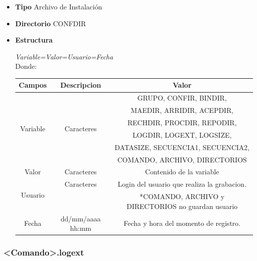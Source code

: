 \documentclass[a4paper,10pt,titlepage]{article}
\begin{document}
			\begin {itemize}
				\item \textbf{Tipo} {Archivo de Instalaci\'on}
				\item \textbf{Directorio} {CONFDIR}
				\item \textbf{Estructura} {\textit{	Variable=Valor=Usuario=Fecha}\\
					Donde: \ 
					\begin{table}[H]
					\centering
					\begin{tabular}{| c | c | c |}
						\hline
						Campos 	& Descripcion & Valor \\
						\hline
						\multirow{6}{*}{Variable} & \multirow{6}{*}{Caracteres}	& GRUPO, CONFIR, BINDIR, \\
								{}			  & {}							 & MAEDIR, ARRIDIR, ACEPDIR, \\
								{}			& 	{}						& RECHDIR, PROCDIR, REPODIR, \\
								{}			& {}  							& LOGDIR, LOGEXT, LOGSIZE, \\
								{}			& 	{}						& DATASIZE, SECUENCIA1, SECUENCIA2, \\
								{}			& {} 							& COMANDO, ARCHIVO, DIRECTORIOS\\ 
						\hline 
						Valor 	& Caracteres 	& Contenido de la variable \\
						\hline
						\multirow{2}{*}{Usuario} & Caracteres & Login del usuario que realiza la grabacion. \\
											 &			&\small{ *COMANDO, ARCHIVO y DIRECTORIOS no guardan usuario}\\
						\hline
						Fecha	& dd/mm/aaaa hh:mm 	&	Fecha y hora del momento de registro. \\
						\hline
	
					\end{tabular}
					\end{table}
				}
			\end{itemize}
		
		\subsubsection{<Comando>.logext}
\end{document}
